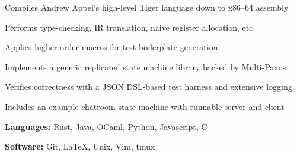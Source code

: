 \documentclass{resume}
\begin{document}
\begin{projects}
    \begin{description}
        \item Compiles Andrew Appel's high-level Tiger language down to x86--64 assembly
        \item Performs type-checking, IR translation, naive register allocation, etc.
        \item Applies higher-order macros for test boilerplate generation
    \end{description}

    \begin{description}
        \item Implements a generic replicated state machine library backed by Multi-Paxos
        \item Verifies correctness with a JSON DSL-based test harness and extensive logging
        \item Includes an example chatroom state machine with runnable server and client
    \end{description}
\end{projects}

\begin{skills}
    \begin{description}
        \item \textbf{Languages:} Rust, Java, OCaml, Python, Javascript, C
        \item \textbf{Software:} Git, LaTeX, Unix, Vim, tmux
    \end{description}
\end{skills}
\end{document}
